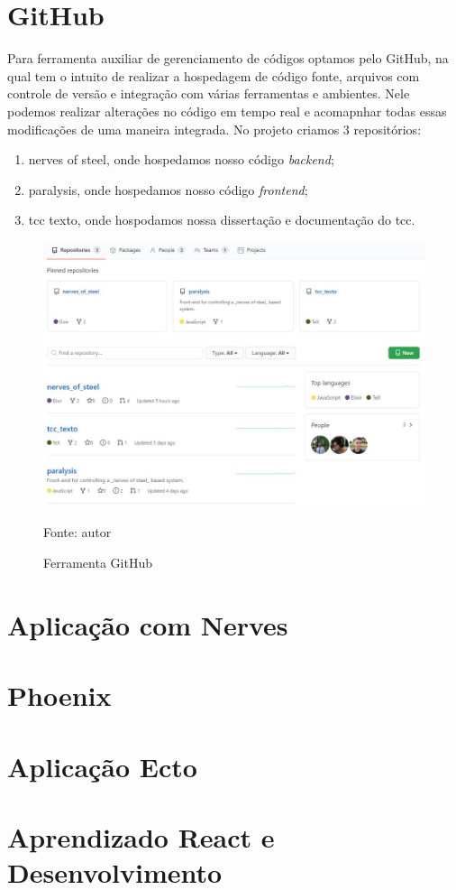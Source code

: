 \documentclass[../../layout.tex]{subfiles}
\begin{document}
\section{GitHub}
\hspace*{3em}Para ferramenta auxiliar de gerenciamento de códigos optamos pelo GitHub, na qual tem o intuito de realizar a hospedagem de código fonte, arquivos com controle de versão e integração com várias ferramentas e ambientes. Nele podemos realizar alterações no código em tempo real e acomapnhar todas essas modificações de uma maneira integrada. No projeto criamos 3 repositórios:

\begin{enumerate}[label=\alph*)]
\itemsep0em
    \item nerves of steel, onde hospedamos nosso código \emph{backend};
    \item paralysis, onde hospedamos nosso código \emph{frontend};
    \item tcc texto, onde hospodamos nossa dissertação e documentação do tcc.
\end{enumerate}

\begin{figure}[H]
\centering
\caption{Ferramenta GitHub}
\includegraphics[width=1\textwidth]{assets/static/img/git.jpg}
\label{fig:i2c_structure}

\begin{minipage}{0.5\textwidth}
\raggedright \footnotesize Fonte: autor 
\end{minipage}
\end{figure}


\section{Aplicação com Nerves}
\hspace*{3em}\blindtext[1]
\section{Phoenix}
\hspace*{3em}\blindtext[1]
\section{Aplicação Ecto}
\hspace*{3em}\blindtext[1]
\section{Aprendizado React e Desenvolvimento}
\blindtext
\end{document}
